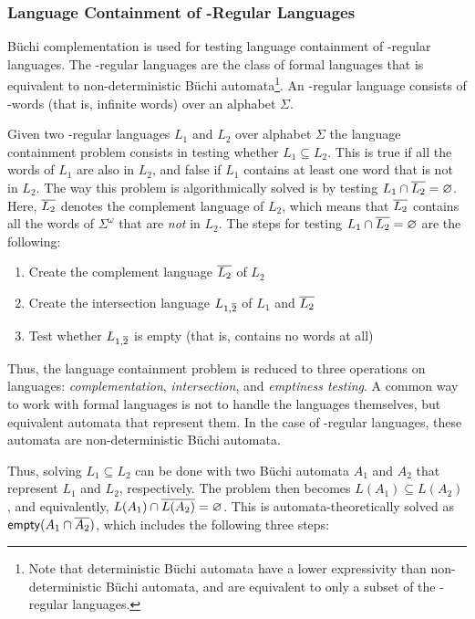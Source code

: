 \subsubsection{Language Containment of \om-Regular Languages}
Büchi complementation is used for testing language containment of \om-regular languages. The \om-regular languages are the class of formal languages that is equivalent to non-deterministic Büchi automata\footnote{Note that deterministic Büchi automata have a lower expressivity than non-deterministic Büchi automata, and are equivalent to only a subset of the \om-regular languages.}. An \om-regular language consists of \om-words (that is, infinite words) over an alphabet $\Sigma$.

Given two \om-regular languages $L_1$ and $L_2$ over alphabet $\Sigma$ the language containment problem consists in testing whether $L_1 \subseteq L_2$. This is true if all the words of $L_1$ are also in $L_2$, and false if $L_1$ contains at least one word that is not in $L_2$. The way this problem is algorithmically solved is by testing $L_1 \cap \cl1{L_2} = \varnothing$. Here, $\cl1{L_2}$ denotes the complement language of $L_2$, which means that $\cl1{L_2}$ contains all the words of $\Sigma^\omega$ that are \textit{not} in $L_2$. The steps for testing $L_1 \cap \cl1{L_2} = \varnothing$ are the following:

\begin{enumerate}
\item Create the complement language $\cl1{L_2}$ of $L_2$
\item Create the intersection language $L_{1,\cl1{2}}$ of $L_1$ and $\cl1{L_2}$
\item Test whether $L_{1,\cl1{2}}$ is empty (that is, contains no words at all)
\end{enumerate}

Thus, the language containment problem is reduced to three operations on languages: \textit{complementation}, \textit{intersection}, and \textit{emptiness testing}. A common way to work with formal languages is not to handle the languages themselves, but equivalent automata that represent them. In the case of \om-regular languages, these automata are non-deterministic Büchi automata.

Thus, solving $L_1 \subseteq L_2$ can be done with two Büchi automata $A_1$ and $A_2$ that represent $L_1$ and $L_2$, respectively. The problem then becomes $L(A_1) \subseteq L(A_2)$, and equivalently, $L(A_1) \cap \cl1{L(A_2)} = \varnothing$. This is automata-theoretically solved as $\text{\textsf{empty}}(A_1 \cap \cl1{A_2})$, which includes the following three steps:

